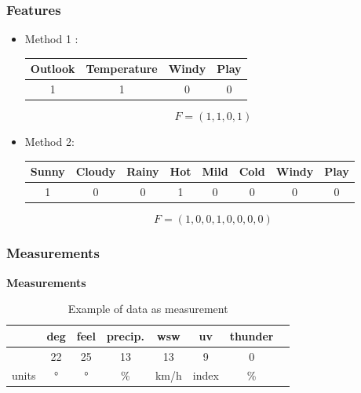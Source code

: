 \documentclass{beamer}
\begin{document}
\begin{frame}[t]
  \frametitle{Features}
  
  \begin{itemize}
    \item \alert{Method 1} :\\[0.5cm]
      \begin{center}
      \begin{tabular}{|c|c|c|c|}
        \hline
        Outlook & Temperature & Windy & Play\\\hline
        1 &  1 & 0 & 0 \\
        \hline
      \end{tabular}
    \end{center}
      \pause
      $$
      F = (1, 1, 0, 1)
      $$
      \pause
    \item \alert{Method 2}: \\[0.3cm]

      \begin{center}
      \begin{tabular}{|c|c|c|c|c|c|c|c|}
        \hline
        Sunny & Cloudy & Rainy & Hot & Mild & Cold & Windy & Play\\\hline
        1 &  0 & 0 & 1 & 0 & 0 & 0 & 0 \\
        \hline
      \end{tabular}
    \end{center}
      $$
      F = (1,0,0, 1,0,0, 0, 0)
      $$

  \end{itemize}

\end{frame}
\begin{frame}[t]
  \frametitle{Measurements}
 
  \vspace*{1cm}

\begin{center}
  \large
  \textbf{Measurements} 
\end{center}

\begin{table}[]
  \centering
  \begin{tabular}{cccccccc}
    \toprule
     &deg & feel & precip. & wsw & uv & thunder \\ 
    \midrule
     &22 & 25 & 13 & 13 & 9 & 0 \\ 
    \bottomrule
    units & ° & ° & \% & km/h & index & \% \\ 
  \end{tabular}
  \caption{Example of data as measurement}
\end{table}
\end{frame}
\end{document}
